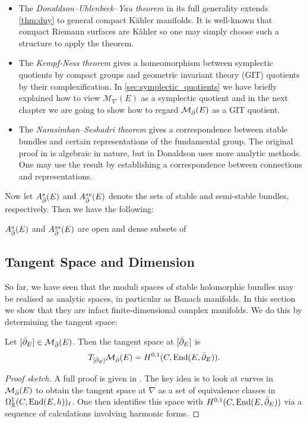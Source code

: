 \documentclass[12pt]{ociamthesis}  %
\begin{document}
\begin{itemize}
  \item The \emph{Donaldson–Uhlenbeck–Yau theorem} \missingcitation
        in its full generality extends \ref{thm:duy} to general compact
        K\"ahler manifolds. It is well-known that compact Riemann surfaces
        are K\"ahler \missingcitation so one may simply choose such a structure to
        apply the theorem.
  \item The \emph{Kempf-Ness theorem} \missingcitation gives a homeomorphism between
        symplectic quotients by compact groups and geometric invariant
        theory (GIT) quotients by their complexification. In
        \ref{sec:symplectic_quotients} we have briefly
        explained how to view $\mathcal M_\nabla(E)$ as a symplectic quotient
        and in the next chapter we are going to show how to regard
        $\mathcal M_{\bar{\partial}}(E)$ as a GIT quotient.
  \item The \emph{Narasimhan–Seshadri theorem} \cite[Theorem 8.1]{ns1965} gives
        a correspondence between stable bundles and certain representations
        of the fundamental group. The original proof in \cite{ns1965}
        is algebraic in nature, but in \cite{donaldson1983} Donaldson
        uses more analytic methods. One may use the result by establishing
        a correspondence between connections and representations.
\end{itemize}

Now let $A^s_{{\bar{\partial}}}(E)$ and $A^{ss}_{\bar{\partial}}(E)$ denote the sets of stable
and semi-stable bundles, respectively. Then we have the following:

\begin{lemma}
  $A^s_{{\bar{\partial}}}(E)$ and $A^{ss}_{{\bar{\partial}}}(E)$ are open and dense subsets
  of 
\end{lemma}


\subsection{Tangent Space and Dimension}

So far, we have seen that the moduli spaces of stable holomorphic
bundles may be realised as analytic spaces, in particular as
Banach manifolds. In this section we show that they are infact
finite-dimensional complex manifolds. We do this by determining
the tangent space:

\begin{theorem}
  Let $[{\bar{\partial}}_E]\in\mathcal M_{\bar{\partial}}(E)$. Then the tangent space at $[{\bar{\partial}}_E]$ is
  \begin{align*}
    T_{[{\bar{\partial}}_E]}\mathcal M_{\bar{\partial}}(E) = H^{0,1}(C,\operatorname{End}(E,{\bar{\partial}}_E)).
  \end{align*}
  \begin{proof}[Proof sketch]
    A full proof is given in \cite[223-225]{kobayashi1987}. The key idea is to look
    at curves in $\mathcal M_{\bar{\partial}}(E)$ to obtain the tangent space at $\nabla$ as a set of
    equivalence classes in $\Omega^1_{\mathbb{R}}(C,\operatorname{End}(E,h))_\ell$. One then
    identifies this space with $H^{0,1}(C,\operatorname{End}(E,{\bar{\partial}}_E))$ via a sequence of calculations
    involving harmonic forms.
  \end{proof}
\end{theorem}
\end{document}
